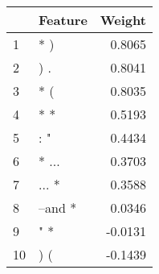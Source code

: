 \begin{tabular}{llr}
\toprule
{} &  Feature &  Weight \\
\midrule
1  &      * ) &  0.8065 \\
2  &      ) . &  0.8041 \\
3  &      * ( &  0.8035 \\
4  &      * * &  0.5193 \\
5  &      : " &  0.4434 \\
6  &    * ... &  0.3703 \\
7  &    ... * &  0.3588 \\
8  &  --and * &  0.0346 \\
9  &      " * & -0.0131 \\
10 &      ) ( & -0.1439 \\
\bottomrule
\end{tabular}

